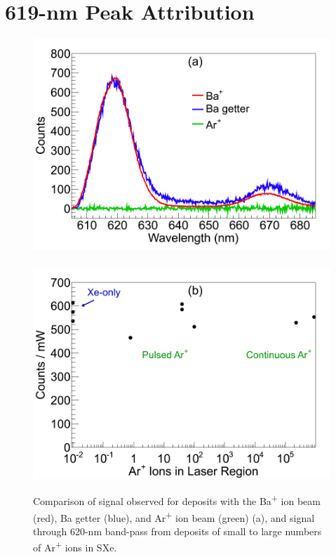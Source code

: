 

\section{619-nm Peak Attribution}
\label{sec:619identification}

\begin{figure} %
        \centering
                \includegraphics[width=.5\textwidth]{figures/Ar_vs_Ba.png}
                ~
                \includegraphics[width=.5\textwidth]{figures/ArImaging.png}
                \caption{Comparison of signal observed for deposits with the Ba\textsuperscript{+} ion beam (red), Ba getter (blue), and Ar\textsuperscript{+} ion beam (green) (a), and signal through 620-nm band-pass from deposits of small to large numbers of Ar\textsuperscript{+} ions in SXe.}
\label{fig:ArVsBa}
\end{figure}

